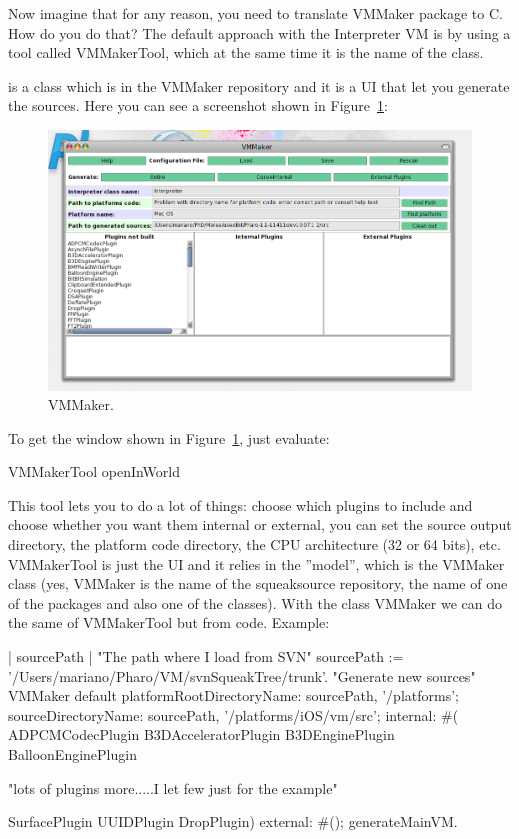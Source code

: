 \documentclass[a4paper,10pt,twoside]{book}
\begin{document}
Now imagine that for any reason, you need to translate VMMaker package to C. How do you do that? The default approach with the Interpreter VM is by using a tool called VMMakerTool, which at the same time it is the name of the class.

 is a class which is in the VMMaker repository and it is a UI that let you generate the sources. Here you can see a screenshot shown in Figure~\ref{vmMaker}:

\begin{figure}[!h]
\includegraphics[width=\linewidth]{vmMaker}
\caption{VMMaker.\label{vmMaker}}
\end{figure}



To get the window shown in Figure~\ref{vmMaker}, just evaluate:
\begin{code}{}
VMMakerTool openInWorld
\end{code}

This tool lets you to do a lot of things: choose which plugins to include and choose whether you want them internal or external, you can set the source output directory, the platform code directory, the CPU architecture (32 or 64 bits), etc. VMMakerTool is just the UI and it relies in the ''model'', which is the VMMaker class (yes, VMMaker is the name of the squeaksource repository, the name of one of the packages and also one of the classes). With the class VMMaker we can do the same of VMMakerTool but from code. Example:

\begin{code}{}
| sourcePath |
"The path where I load from SVN"
sourcePath := '/Users/mariano/Pharo/VM/svnSqueakTree/trunk'.
"Generate new sources"
VMMaker default
	platformRootDirectoryName: sourcePath, '/platforms';
	sourceDirectoryName: sourcePath, '/platforms/iOS/vm/src';
	internal: #(
		ADPCMCodecPlugin	
		B3DAcceleratorPlugin
		B3DEnginePlugin
		BalloonEnginePlugin
 
	"lots of plugins more.....I let few just for the example"

		SurfacePlugin
		UUIDPlugin
		DropPlugin)
	external: #();
	generateMainVM.
\end{code}
\end{document}
